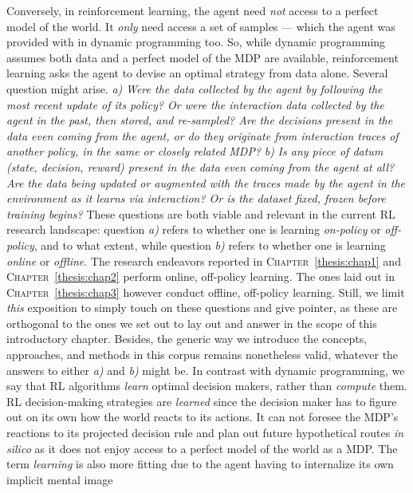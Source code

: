 Conversely, in reinforcement learning, the agent need \emph{not} access to a perfect model of the world.
It \emph{only} need access a set of samples --- which the agent was provided with in dynamic programming too.
So, while dynamic programming assumes both data and a perfect model of the MDP are available,
reinforcement learning asks the agent to devise an optimal strategy from data alone.
Several question might arise. \textit{a)} \textit{Were the data collected by the agent
by following the most recent update of its
policy? Or were the interaction data collected by the agent in the past, then stored, and re-sampled?
Are the decisions present in the data even coming from the agent,
or do they originate from interaction traces of
another policy, in the same or closely related MDP?}
\textit{b)} \textit{Is any piece of datum (state, decision, reward)
present in the data even coming from the agent at all?
Are the data being updated or augmented with the traces made by the agent in the environment
as it learns via interaction?
Or is the dataset fixed, frozen before training begins?}
These questions are both viable and relevant in the current RL research landscape:
question \textit{a)} refers to whether one is learning \textit{on-policy} or \textit{off-policy}, and to what extent,
while question \textit{b)} refers to whether one is learning \textit{online} or \textit{offline}.
The research endeavors reported in \textsc{Chapter}~\ref{thesis:chap1} and \textsc{Chapter}~\ref{thesis:chap2}
perform online, off-policy learning.
The ones laid out in \textsc{Chapter}~\ref{thesis:chap3} however
conduct offline, off-policy learning.
Still, we limit \textit{this} exposition to simply touch on these questions and give pointer,
as these are orthogonal to the ones we set out to lay out and answer in the scope of this introductory chapter.
Besides, the generic way we introduce the concepts, approaches, and methods in this corpus remains nonetheless valid,
whatever the answers to either \textit{a)} and \textit{b)} might be.
In contrast with dynamic programming, we say that RL algorithms \emph{learn} optimal decision makers,
rather than \emph{compute} them. RL decision-making strategies are \emph{learned} since the decision maker
has to figure out on its own how the world reacts to its actions. It can not foresee the MDP's reactions to its
projected decision rule and plan out future hypothetical routes \textit{in silico} as it does not
enjoy access to a perfect model of the world as a MDP.
The term \textit{learning} is also more fitting due to the agent having to internalize its own implicit mental image
